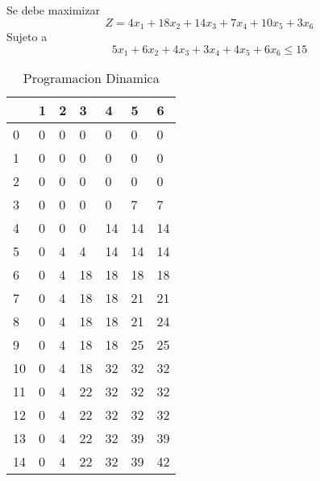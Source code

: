 \documentclass{article}
\begin{document}
\begin{center}

Se debe maximizar $$Z = 4x_1+18x_2+14x_3+7x_4+10x_5+3x_6$$ 
Sujeto a $$
5x_1+6x_2+4x_3+3x_4+4x_5+6x_6\leq 15$$\begin{table}
\centering
\caption{Programacion Dinamica}
\begin{tabularx}{\textwidth}{|X|X|X|X|X|X|X|}
\hline&1&2&3&4&5&6 \\
\hline 0&\cellcolor{red}0&\cellcolor{red}0&\cellcolor{red}0&\cellcolor{red}0&\cellcolor{red}0&\cellcolor{red}0\\
\hline 1&\cellcolor{red}0&\cellcolor{red}0&\cellcolor{red}0&\cellcolor{red}0&\cellcolor{red}0&\cellcolor{red}0\\
\hline 2&\cellcolor{red}0&\cellcolor{red}0&\cellcolor{red}0&\cellcolor{red}0&\cellcolor{red}0&\cellcolor{red}0\\
\hline 3&\cellcolor{red}0&\cellcolor{red}0&\cellcolor{red}0&\cellcolor{red}0&\cellcolor{green}7&\cellcolor{red}7\\
\hline 4&\cellcolor{red}0&\cellcolor{red}0&\cellcolor{red}0&\cellcolor{green}14&\cellcolor{red}14&\cellcolor{red}14\\
\hline 5&\cellcolor{red}0&\cellcolor{green}4&\cellcolor{red}4&\cellcolor{green}14&\cellcolor{red}14&\cellcolor{red}14\\
\hline 6&\cellcolor{red}0&\cellcolor{green}4&\cellcolor{green}18&\cellcolor{red}18&\cellcolor{red}18&\cellcolor{red}18\\
\hline 7&\cellcolor{red}0&\cellcolor{green}4&\cellcolor{green}18&\cellcolor{red}18&\cellcolor{green}21&\cellcolor{red}21\\
\hline 8&\cellcolor{red}0&\cellcolor{green}4&\cellcolor{green}18&\cellcolor{red}18&\cellcolor{green}21&\cellcolor{green}24\\
\hline 9&\cellcolor{red}0&\cellcolor{green}4&\cellcolor{green}18&\cellcolor{red}18&\cellcolor{green}25&\cellcolor{red}25\\
\hline 10&\cellcolor{red}0&\cellcolor{green}4&\cellcolor{green}18&\cellcolor{green}32&\cellcolor{red}32&\cellcolor{red}32\\
\hline 11&\cellcolor{red}0&\cellcolor{green}4&\cellcolor{green}22&\cellcolor{green}32&\cellcolor{red}32&\cellcolor{red}32\\
\hline 12&\cellcolor{red}0&\cellcolor{green}4&\cellcolor{green}22&\cellcolor{green}32&\cellcolor{red}32&\cellcolor{red}32\\
\hline 13&\cellcolor{red}0&\cellcolor{green}4&\cellcolor{green}22&\cellcolor{green}32&\cellcolor{green}39&\cellcolor{red}39\\
\hline 14&\cellcolor{red}0&\cellcolor{green}4&\cellcolor{green}22&\cellcolor{green}32&\cellcolor{green}39&\cellcolor{green}42\\
\hline
\end{tabularx}
\end{table}
\end{center}
\end{document}
